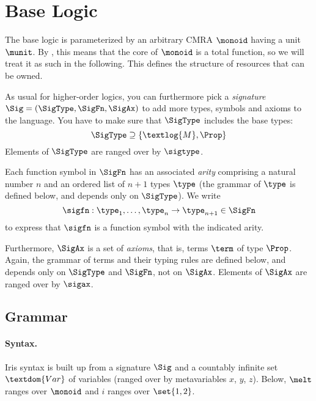 \section{Base Logic}
\label{sec:base-logic}

The base logic is parameterized by an arbitrary CMRA $\monoid$ having a unit $\munit$.
By , this means that the core of $\monoid$ is a total function, so we will treat it as such in the following.
This defines the structure of resources that can be owned.

As usual for higher-order logics, you can furthermore pick a \emph{signature} $\Sig = (\SigType, \SigFn, \SigAx)$ to add more types, symbols and axioms to the language.
You have to make sure that $\SigType$ includes the base types:
\[
	\SigType \supseteq \{ \textlog{M}, \Prop \}
\]
Elements of $\SigType$ are ranged over by $\sigtype$.

Each function symbol in $\SigFn$ has an associated \emph{arity} comprising a natural number $n$ and an ordered list of $n+1$ types $\type$ (the grammar of $\type$ is defined below, and depends only on $\SigType$).
We write
\[
	\sigfn : \type_1, \dots, \type_n \to \type_{n+1} \in \SigFn
\]
to express that $\sigfn$ is a function symbol with the indicated arity.

Furthermore, $\SigAx$ is a set of \emph{axioms}, that is, terms $\term$ of type $\Prop$.
Again, the grammar of terms and their typing rules are defined below, and depends only on $\SigType$ and $\SigFn$, not on $\SigAx$.
Elements of $\SigAx$ are ranged over by $\sigax$.

\subsection{Grammar}\label{sec:grammar}

\paragraph{Syntax.}
Iris syntax is built up from a signature $\Sig$ and a countably infinite set $\textdom{Var}$ of variables (ranged over by metavariables $x$, $y$, $z$).
Below, $\melt$ ranges over $\monoid$ and $i$ ranges over $\set{1,2}$.

